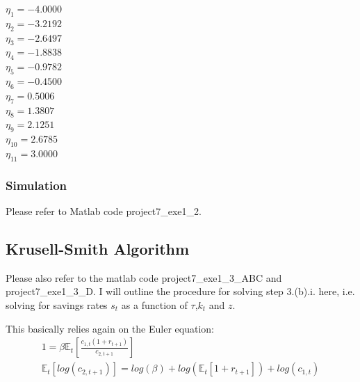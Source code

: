 \documentclass[12pt,a4paper]{article}
\begin{document}
$\eta_1 = -4.0000  $ \\
$\eta_2 = -3.2192 $ \\
$\eta_3 = -2.6497 $ \\
$\eta_4 = -1.8838 $ \\
$\eta_5 = -0.9782 $ \\
$\eta_6 = -0.4500 $ \\
$\eta_7 = 0.5006 $ \\
$\eta_8 = 1.3807 $ \\
$\eta_9 = 2.1251 $ \\
$\eta_{10} = 2.6785 $ \\
$\eta_{11} = 3.0000 $ \\

\subsubsection{Simulation}
Please refer to Matlab code project7\_exe1\_2.

\subsection{Krusell-Smith Algorithm}
Please also refer to the matlab code project7\_exe1\_3\_ABC and project7\_exe1\_3\_D. I will outline the procedure for solving step 3.(b).i. here, i.e. solving for savings rates $s_t$ as a function of $\tau$,$k_t$ and $z$.

This basically relies again on the Euler equation:
\begin{align*}
          1 = \beta \mathbb{E}_t \left[ \frac{c_{1,t} (1+r_{t+1})}{c_{2,t+1}} \right]\\
          \mathbb{E}_t\left[log\left(c_{2,t+1}\right)\right] = log\left(\beta\right) + log\left( \mathbb{E}_t \left[1+r_{t+1}\right]\right)  + log\left( c_{1,t} \right)
\end{align*}
\end{document}
